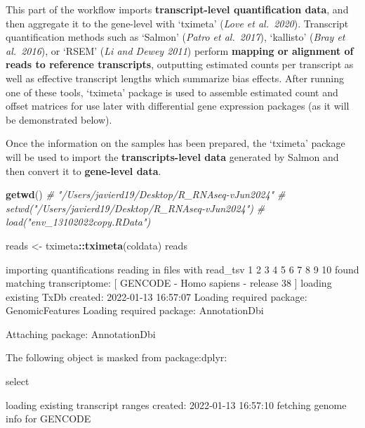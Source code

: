 \documentclass[
]{article}
\newenvironment{Shaded}{\begin{snugshade}}{\end{snugshade}}
\newcommand{\CommentTok}[1]{\textcolor[rgb]{0.56,0.35,0.01}{\textit{#1}}}
\newcommand{\FunctionTok}[1]{\textcolor[rgb]{0.13,0.29,0.53}{\textbf{#1}}}
\newcommand{\NormalTok}[1]{#1}
\newcommand{\OtherTok}[1]{\textcolor[rgb]{0.56,0.35,0.01}{#1}}
\newcommand{\SpecialCharTok}[1]{\textcolor[rgb]{0.81,0.36,0.00}{\textbf{#1}}}
\begin{document}
This part of the workflow imports \textbf{transcript-level
quantification data}, and then aggregate it to the gene-level with
`tximeta' (\emph{Love et al.~2020}). Transcript quantification methods
such as `Salmon' (\emph{Patro et al.~2017}), `kallisto' (\emph{Bray et
al.~2016}), or `RSEM' (\emph{Li and Dewey 2011}) perform \textbf{mapping
or alignment of reads to reference transcripts}, outputting estimated
counts per transcript as well as effective transcript lengths which
summarize bias effects. After running one of these tools, `tximeta'
package is used to assemble estimated count and offset matrices for use
later with differential gene expression packages (as it will be
demonstrated below).

Once the information on the samples has been prepared, the `tximeta'
package will be used to import the \textbf{transcripts-level data}
generated by Salmon and then convert it to \textbf{gene-level data}.

\begin{Shaded}
\begin{Highlighting}[]
\FunctionTok{getwd}\NormalTok{()}
\CommentTok{\# "/Users/javierd19/Desktop/R\_RNAseq{-}vJun2024"}
\CommentTok{\# setwd("/Users/javierd19/Desktop/R\_RNAseq{-}vJun2024")}
\CommentTok{\# load("env\_13102022copy.RData")}
\end{Highlighting}
\end{Shaded}

\begin{Shaded}
\begin{Highlighting}[]
\NormalTok{reads }\OtherTok{\textless{}{-}}\NormalTok{ tximeta}\SpecialCharTok{::}\FunctionTok{tximeta}\NormalTok{(coldata)}
\NormalTok{reads}
\end{Highlighting}
\end{Shaded}

\begin{Shaded}
\begin{Highlighting}[]
\NormalTok{importing quantifications}
\NormalTok{reading in files with read\_tsv}
\NormalTok{1 2 3 4 5 6 7 8 9 10 }
\NormalTok{found matching transcriptome:}
\NormalTok{[ GENCODE {-} Homo sapiens {-} release 38 ]}
\NormalTok{loading existing TxDb created: 2022{-}01{-}13 16:57:07}
\NormalTok{Loading required package: GenomicFeatures}
\NormalTok{Loading required package: AnnotationDbi}

\NormalTok{Attaching package: \textquotesingle{}AnnotationDbi\textquotesingle{}}

\NormalTok{The following object is masked from \textquotesingle{}package:dplyr\textquotesingle{}:}

\NormalTok{    select}

\NormalTok{loading existing transcript ranges created: 2022{-}01{-}13 16:57:10}
\NormalTok{fetching genome info for GENCODE}
\end{Highlighting}
\end{Shaded}
\end{document}
